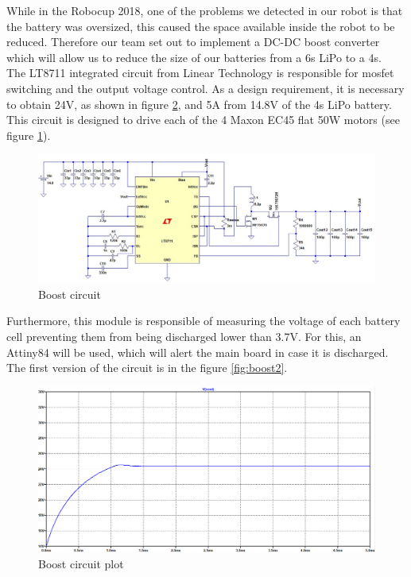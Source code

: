 \documentclass{llncs}
\begin{document}
While in the Robocup 2018, one of the problems we detected in our robot is that the battery was oversized, this caused the space available inside the robot to be reduced. Therefore our team set out to implement a DC-DC boost converter which will allow us to reduce the size of our batteries from a 6s LiPo to a 4s.\\

The LT8711 integrated circuit from Linear Technology is responsible for mosfet switching and the output voltage control. As a design requirement, it is necessary to obtain 24V, as shown in figure \ref{fig:boost1}, and 5A from 14.8V of the 4s LiPo battery. This circuit is designed to drive each of the 4 Maxon EC45 flat 50W motors (see figure \ref{fig:boost}).\\

\begin{figure}[h]
    \centering
    \includegraphics[width=1.1\textwidth]{Images/Power_source_motor.png} 
    \caption{Boost circuit}
    \label{fig:boost}
\end{figure}

Furthermore, this module is responsible of measuring the voltage of each battery cell preventing them from being discharged lower than 3.7V. For this, an Attiny84 will be used, which will alert the main board in case it is discharged. The first version of the circuit is in the figure \ref{fig:boost2}.

\begin{figure}[H]
    \centering
    \includegraphics[width= 0.9\linewidth, clip]{Images/Power_source_motor1.png}
    \caption{Boost circuit plot}
    \label{fig:boost1}
\end{figure}
\end{document}
